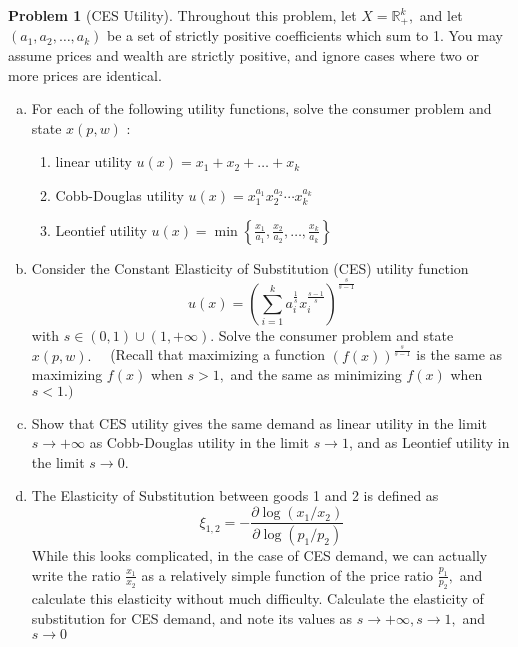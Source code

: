 \documentclass{article}
\theoremstyle{definition}
\newtheorem{problem}{Problem}
\begin{document}
\begin{problem}[CES Utility]
Throughout this problem, let $X=\mathbb{R}_{+}^{k},$ and let $\left(a_{1}, a_{2}, \ldots, a_{k}\right)$ be a set of strictly positive coefficients
which sum to 1. You may assume prices and wealth are strictly positive, and ignore cases where
two or more prices are identical.

\begin{enumerate}[(a)]
    \item For each of the following utility functions, solve the consumer problem and state $x(p, w)$ :
    \begin{enumerate}[i]
        \item linear utility $u(x)=x_{1}+x_{2}+\ldots+x_{k}$
        \item Cobb-Douglas utility $u(x)=x_{1}^{a_{1}} x_{2}^{a_{2}} \cdots x_{k}^{a_{k}}$
        \item Leontief utility $u(x)=\min \left\{\frac{x_{1}}{a_{1}}, \frac{x_{2}}{a_{2}}, \ldots, \frac{x_{k}}{a_{k}}\right\}$
    \end{enumerate}
    \item Consider the Constant Elasticity of Substitution (CES) utility function
    $$
    u(x)=\left(\sum_{i=1}^{k} a_{i}^{\frac{1}{s}} x_{i}^{\frac{s-1}{s}}\right)^{\frac{s}{s-1}}
    $$
    with $s \in(0,1) \cup(1,+\infty) .$ Solve the consumer problem and state $x(p, w) . \quad$ (Recall that maximizing a function $(f(x))^{\frac{s}{s-1}}$ is the same as maximizing $f(x)$ when $s>1,$ and the same as minimizing $f(x)$ when $s<1 .)$
    \item Show that $\mathrm{CES}$ utility gives the same demand as linear utility in the limit $s \rightarrow+\infty$ as Cobb-Douglas utility in the limit $s \rightarrow 1$,
and as Leontief utility in the limit $s \rightarrow 0$.
    \item The Elasticity of Substitution between goods 1 and 2 is defined as
$$
\xi_{1,2}=-\frac{\partial \log \left(x_{1} / x_{2}\right)}{\partial \log \left(p_{1} / p_{2}\right)}
$$
While this looks complicated, in the case of CES demand, we can actually write the ratio $\frac{x_{1}}{x_{2}}$ as a relatively simple function of the price ratio $\frac{p_{1}}{p_{2}},$ and calculate this elasticity without much difficulty. Calculate the elasticity of substitution for CES demand, and note its values as $s \rightarrow+\infty, s \rightarrow 1,$ and $s \rightarrow 0$
\end{enumerate}
\end{problem}
                                                                                                                                     
\end{document}
